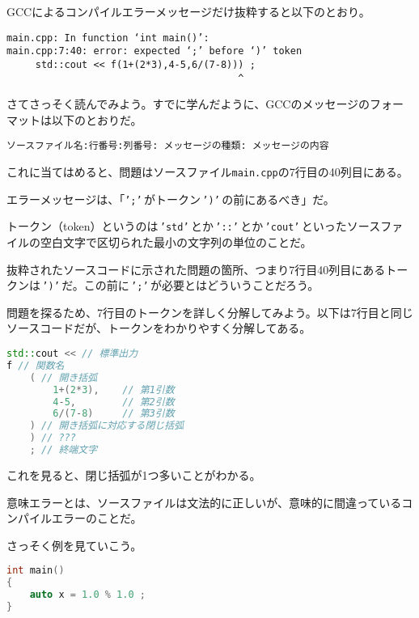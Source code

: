 GCCによるコンパイルエラーメッセージだけ抜粋すると以下のとおり。

\begin{lstlisting}[style=terminal]
main.cpp: In function ‘int main()’:
main.cpp:7:40: error: expected ‘;’ before ‘)’ token
     std::cout << f(1+(2*3),4-5,6/(7-8))) ;
                                        ^
\end{lstlisting}

さてさっそく読んでみよう。すでに学んだように、GCCのメッセージのフォーマットは以下のとおりだ。

\begin{lstlisting}[style=grammar]
ソースファイル名:行番号:列番号: メッセージの種類: メッセージの内容
\end{lstlisting}

これに当てはめると、問題はソースファイル\texttt{main.cpp}の7行目の40列目にある。

エラーメッセージは、「\texttt{';'}\,がトークン\,\texttt{')'}\,の前にあるべき」だ。

トークン（token）というのは\,\texttt{'std'}\,とか\,\texttt{'::'}\,とか\,\texttt{'cout'}\,といったソースファイルの空白文字で区切られた最小の文字列の単位のことだ。

抜粋されたソースコードに示された問題の箇所、つまり7行目40列目にあるトークンは\,\texttt{')'}\,だ。この前に\,\texttt{';'}\,が必要とはどういうことだろう。

問題を探るため、7行目のトークンを詳しく分解してみよう。以下は7行目と同じソースコードだが、トークンをわかりやすく分解してある。

\begin{lstlisting}[language=c++]
std::cout << // 標準出力
f // 関数名
    ( // 開き括弧
        1+(2*3),    // 第1引数
        4-5,        // 第2引数
        6/(7-8)     // 第3引数
    ) // 開き括弧に対応する閉じ括弧
    ) // ???
    ; // 終端文字
\end{lstlisting}

これを見ると、閉じ括弧が1つ多いことがわかる。

\clearpage
{}

意味エラーとは、ソースファイルは文法的に正しいが、意味的に間違っているコンパイルエラーのことだ。

さっそく例を見ていこう。

\begin{lstlisting}[language=c++]
int main()
{
    auto x = 1.0 % 1.0 ;
}
\end{lstlisting}

